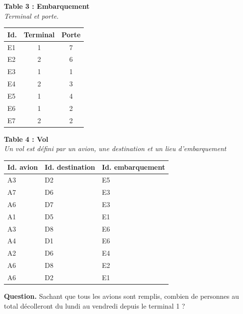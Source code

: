 \documentclass[class=report,crop=false, 12pt]{standalone}
\begin{document}
\begin{enigme}
\begin{center}
{\begin{minipage}{0.3\textwidth}
\textbf{Table 3 : Embarquement}\\
\emph{Terminal et porte.} \\

\begin{tabular}{|l|c|c|} \hline
\textbf{Id.} & \textbf{Terminal} & \textbf{Porte} \\ \hline\hline
E1 & 1 & 7 \\ \hline
E2 & 2 & 6 \\ \hline
E3 & 1 & 1 \\ \hline
E4 & 2 & 3 \\ \hline
E5 & 1 & 4 \\ \hline
E6 & 1 & 2 \\ \hline
E7 & 2 & 2 \\ \hline
\end{tabular}
\end{minipage}
}
\end{center}


\bigskip

\begin{center}
{\small %
\textbf{Table 4 : Vol}\\
\emph{Un vol est défini par un avion, une destination et un lieu d'embarquement} \\

\begin{tabular}{|l|l|l|} \hline
\textbf{Id. avion} & \textbf{Id. destination} & \textbf{Id. embarquement}\\ \hline\hline
A3 & D2 & E5 \\ \hline
A7 & D6 & E3 \\ \hline
A6 & D7 & E3 \\ \hline
A1 & D5 & E1 \\ \hline
A3 & D8 & E6 \\ \hline
A4 & D1 & E6 \\ \hline
A2 & D6 & E4 \\ \hline
A6 & D8 & E2 \\ \hline
A6 & D2 & E1 \\ \hline
\end{tabular}
}
\end{center}
 
\bigskip

\textbf{Question.} Sachant que tous les avions sont remplis, combien de personnes au total décolleront du lundi au vendredi depuis le terminal 1 ?


\end{enigme}
\end{document}

